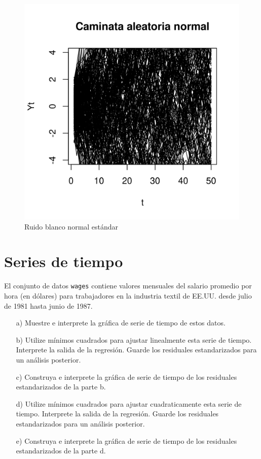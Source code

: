 \documentclass[11pt,letterpaper]{article}
\begin{document}
\begin{itemize}
		\begin{figure}[!t]
			\centering
			\includegraphics[width=0.6\linewidth]{../img/rb_enorm.png}
			\caption{Ruido blanco normal estándar}
			\label{fig:3}
		\end{figure}
		
	\end{itemize}
	
	\section{Series de tiempo}
	El conjunto de datos \texttt{wages} contiene valores mensuales del salario promedio por hora (en dólares) para trabajadores en la industria textil de EE.UU. desde julio de 1981 hasta junio de 1987.
	
	\begin{itemize}
		\item[a)] Muestre e interprete la gráfica de serie de tiempo de estos datos.
		\item[b)] Utilize mínimos cuadrados para ajustar linealmente esta serie de tiempo. Interprete la salida de la regresión. Guarde los residuales estandarizados para un análisis posterior.
		\item[c)] Construya e interprete la gráfica de serie de tiempo de los residuales estandarizados de la parte b.
		\item[d)] Utilize mínimos cuadrados para ajustar cuadraticamente esta serie de tiempo. Interprete la salida de la regresión. Guarde los residuales estandarizados para un análisis posterior.
		\item[e)] Construya e interprete la gráfica de serie de tiempo de los residuales estandarizados de la parte d.
	\end{itemize}
\end{document}
